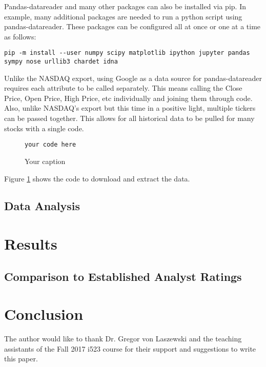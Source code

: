 \documentclass[sigconf]{acmart}
\begin{document}
Pandas-datareader and many other packages can also be installed via pip. In example, many additional packages are needed to run a python script using pandas-datareader. These packages can be configured all at once or one at a time as follows:
\begin{mdframed}[style=default]
\begin{lstlisting}
pip -m install --user numpy scipy matplotlib ipython jupyter pandas sympy nose urllib3 chardet idna
\end{lstlisting}
\end{mdframed}

Unlike the NASDAQ export, using Google as a data source for pandas-datareader requires each attribute to be called separately. This means calling the Close Price, Open Price, High Price, etc individually and joining them through code. Also, unlike NASDAQ's export but this time in a positive light, multiple tickers can be passed together. This allows for all historical data to be pulled for many stocks with a single code. 

\begin{figure}[htb]
\begin{verbatim}
your code here 
\end{verbatim}
\caption{Your caption}\label{c:codexyz}
\end{figure}

Figure \ref{c:codexyz} shows the code to download and extract the data.




\subsection{Data Analysis}



\section{Results}

\subsection{Comparison to Established Analyst Ratings}


\section{Conclusion}


\begin{acks}

The author would like to thank Dr. Gregor von Laszewski and the teaching assistants of the Fall 2017 i523 course for their support and suggestions to write this paper.

\end{acks}


 
\end{document}
